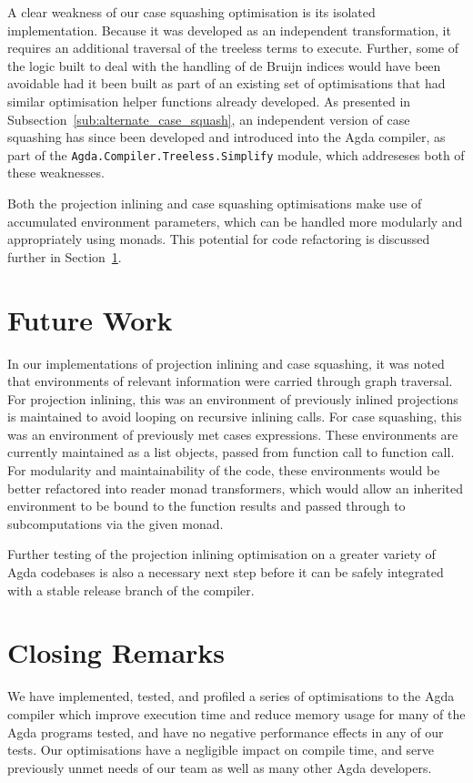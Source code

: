 A clear weakness of our case squashing optimisation is its isolated implementation. Because it was developed as an independent transformation, it requires an additional traversal of the treeless terms to execute. Further, some of the logic built to deal with the handling of de Bruijn indices would have been avoidable had it been built as part of an existing set of optimisations that had similar optimisation helper functions already developed. As presented in Subsection~\ref{sub:alternate_case_squash}, an independent version of case squashing has since been developed and introduced into the Agda compiler, as part of the \lstinline{Agda.Compiler.Treeless.Simplify} module, which addreseses both of these weaknesses.

Both the projection inlining and case squashing optimisations make use of accumulated environment parameters, which can be handled more modularly and appropriately using monads. This potential for code refactoring is discussed further in Section~\ref{sec:future_work}.

\section{Future Work}
\label{sec:future_work}

In our implementations of projection inlining and case squashing, it was noted that environments of relevant information were carried through graph traversal. For projection inlining, this was an environment of previously inlined projections is maintained to avoid looping on recursive inlining calls. For case squashing, this was an environment of previously met cases expressions. These environments are currently maintained as a list objects, passed from function call to function call. For modularity and maintainability of the code, these environments would be better refactored into reader monad transformers, which would allow an inherited environment to be bound to the function results and passed through to subcomputations via the given monad.

Further testing of the projection inlining optimisation on a greater variety of Agda codebases is also a necessary next step before it can be safely integrated with a stable release branch of the compiler.

\section{Closing Remarks}
\label{sec:closing_remarks}

We have implemented, tested, and profiled a series of optimisations to the Agda compiler which improve execution time and reduce memory usage for many of the Agda programs tested, and have no negative performance effects in any of our tests. Our optimisations have a negligible impact on compile time, and serve previously unmet needs of our team as well as many other Agda developers.
